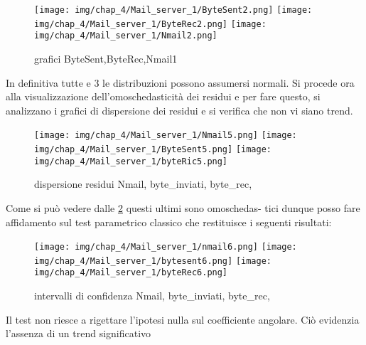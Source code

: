 \begin{figure}[H]
    \centering
    \texttt{[image: img/chap\_4/Mail\_server\_1/ByteSent2.png]}
    \texttt{[image: img/chap\_4/Mail\_server\_1/ByteRec2.png]}
    \texttt{[image: img/chap\_4/Mail\_server\_1/Nmail2.png]}
    \caption{grafici ByteSent,ByteRec,Nmail1}
    \label{fig:sis_2_25_k}
\end{figure}
\noindent
In definitiva tutte e 3 le distribuzioni possono assumersi normali.
Si procede ora alla visualizzazione dell’omoschedasticità dei residui e per fare questo, si analizzano i grafici di dispersione dei residui e si verifica  che non vi siano trend.

\begin{figure}[H]
    \centering
    \texttt{[image: img/chap\_4/Mail\_server\_1/Nmail5.png]}
    \texttt{[image: img/chap\_4/Mail\_server\_1/ByteSent5.png]}
    \texttt{[image: img/chap\_4/Mail\_server\_1/byteRic5.png]}
    \caption{dispersione residui Nmail, byte\_inviati, byte\_rec, }
    \label{fig:residui_omoschedastici1}
\end{figure}
\noindent
Come si può vedere dalle \ref{fig:residui_omoschedastici1} questi ultimi sono omoschedas-
tici dunque posso fare affidamento sul test parametrico classico che
restituisce i seguenti risultati:

\begin{figure}[H]
    \centering
    \texttt{[image: img/chap\_4/Mail\_server\_1/nmail6.png]}
    \texttt{[image: img/chap\_4/Mail\_server\_1/bytesent6.png]}
    \texttt{[image: img/chap\_4/Mail\_server\_1/byteRec6.png]}
    \caption{intervalli di confidenza Nmail, byte\_inviati, byte\_rec, }
    \label{fig:residui_omoschedastici}
\end{figure}
\noindent

Il test non riesce a rigettare l’ipotesi nulla sul coefficiente angolare. Ciò evidenzia l’assenza di un trend significativo


